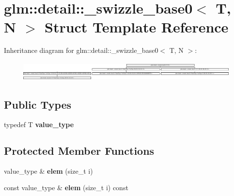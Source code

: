 \hypertarget{structglm_1_1detail_1_1__swizzle__base0}{\section{glm\-:\-:detail\-:\-:\-\_\-swizzle\-\_\-base0$<$ \-T, \-N $>$ \-Struct \-Template \-Reference}
\label{structglm_1_1detail_1_1__swizzle__base0}
}
\-Inheritance diagram for glm\-:\-:detail\-:\-:\-\_\-swizzle\-\_\-base0$<$ \-T, \-N $>$\-:\begin{figure}[H]
\begin{center}
\leavevmode
\includegraphics[height=1.024234cm]{structglm_1_1detail_1_1__swizzle__base0}
\end{center}
\end{figure}
\subsection*{\-Public \-Types}
\begin{DoxyCompactItemize}
\item 
\hypertarget{structglm_1_1detail_1_1__swizzle__base0_ad38a739e1fe6d2db2674f34c98159c8f}{typedef \-T {\bfseries value\-\_\-type}}\label{structglm_1_1detail_1_1__swizzle__base0_ad38a739e1fe6d2db2674f34c98159c8f}

\end{DoxyCompactItemize}
\subsection*{\-Protected \-Member \-Functions}
\begin{DoxyCompactItemize}
\item 
\hypertarget{structglm_1_1detail_1_1__swizzle__base0_a88f08b952f849e69011cb9242d809738}{value\-\_\-type \& {\bfseries elem} (size\-\_\-t i)}\label{structglm_1_1detail_1_1__swizzle__base0_a88f08b952f849e69011cb9242d809738}

\item 
\hypertarget{structglm_1_1detail_1_1__swizzle__base0_aa091a75b3fbc0dd70f49f65225002e2a}{const value\-\_\-type \& {\bfseries elem} (size\-\_\-t i) const }\label{structglm_1_1detail_1_1__swizzle__base0_aa091a75b3fbc0dd70f49f65225002e2a}

\end{DoxyCompactItemize}
